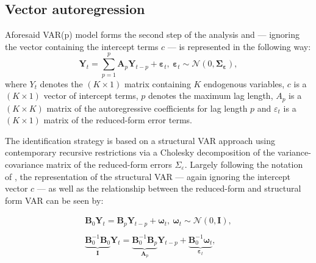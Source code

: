 \subsection{Vector autoregression}


Aforesaid VAR(p) model forms the second step of the analysis and --- ignoring the vector containing the intercept terms $c$ --- is represented in the following way:
\begin{equation}
\bm{Y}_{t}=\sum_{p=1}^p 
\bm{A}_{p} \mathbf{Y}_{t-p}+\bm{\varepsilon}_{t}, \ \bm{\varepsilon}_{t} \sim \mathcal{N}\left(0, \bm{\Sigma_{\varepsilon}}\right),
\end{equation}
where $Y_{t}$ denotes the $(K \times 1)$ matrix containing $K$ endogenous variables, $c$ is a $(K \times 1)$ vector of intercept terms, $p$ denotes the maximum lag length, $A_{p}$ is a $(K \times K)$ matrix of the autoregressive coefficients for lag length $p$ and $\varepsilon_{t}$ is a $(K \times 1)$ matrix of the reduced-form error terms. 

The identification strategy is based on a structural VAR approach using contemporary recursive restrictions via a Cholesky decomposition of the variance-covariance matrix of the reduced-form errors $\Sigma_{\varepsilon}$. Largely following the notation of \citet{kilian2017structural}, the representation of the structural VAR --- again ignoring the intercept vector $c$ --- as well as the relationship between the reduced-form and structural form VAR can be seen by:

\begin{equation}
\label{eq:structural_VAR}
    \begin{split}
   \bm{B}_{0}\bm{Y}_{t}= \bm{B}_{p} \bm{Y}_{t-p}+\bm{\omega}_{t}, \ \bm{\omega}_{t} \sim \mathcal{N}\left(0, \bm{I}\right), \\
   \\
    \underbrace{\bm{B}^{-1}_{0}\bm{B}_{0}}_{\bm{I}}\bm{Y}_{t}= \underbrace{\bm{B}^{-1}_{0}\bm{B}_{p}}_{\bm{A}_{p}} \bm{Y}_{t-p}+\underbrace{\bm{B}^{-1}_{0}\bm{\omega}_{t}}_{\bm{\varepsilon}_{t}},
    \end{split} 
\end{equation}


